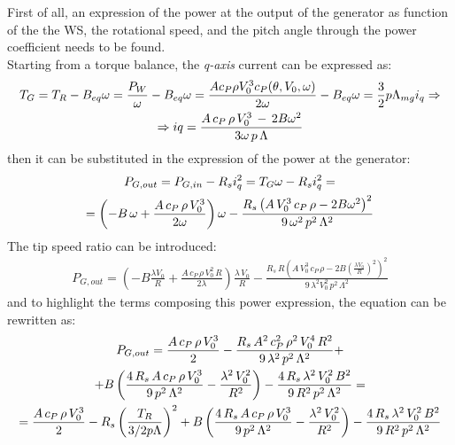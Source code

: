 First of all, an expression of the power at the output of the generator as function of the the WS, the rotational speed, and the pitch angle through the power coefficient needs to be found. \\
Starting from a torque balance, the \textit{q-axis} current can be expressed as:
\begin{gather}
  T_G = T_R - B_{eq}\omega = \frac{P_W}{\omega} - B_{eq}\omega = \frac{A c_P \rho V_0^3 c_P(\theta, V_0, \omega)}{2\omega} - B_{eq}\omega = \frac{3}{2}p\Lambda_{mg}i_q \Rightarrow \notag \\ 
  \Rightarrow iq = \frac{A \, c_P \, \rho \, V_0^3 \,-\,2B\omega^2}{3\omega\,p\,\Lambda} 
\end{gather}
then it can be substituted in the expression of the power at the generator:
\begin{gather}
  P_{G, out} = P_{G, in} - R_s i_q^2 = T_G \omega - R_s i_q^2 = \\ \notag
  = \left(-B\,\omega + \frac{A\,c_P\,\rho\,V_0^3}{2\omega}\right)\omega - \frac{R_s\left(A\,V_0^3\,c_P\,\rho - 2B\omega^2\right)^2}{9\,\omega^2\,p^2\,\Lambda^2} \label{eq:P_G_out_eq}
\end{gather}
The tip speed ratio can be introduced:
\begin{gather}
  P_{G, out} = \left(-B\frac{\lambda V_0}{R} + \frac{A\,c_P\,\rho\,V_0^2\,R}{2\lambda}\right)\frac{\lambda \, V_0}{R} - \frac{R_s\,R\left(A\,V_0^3\,c_P\,\rho - 2B\left(\frac{\lambda V_0}{R}\right)^2\right)^2}{9\,\lambda^2V_0^2\,p^2\,\Lambda^2}\label{eq:P_G_out_lambda}
\end{gather} 
and to highlight the terms composing this power expression, the equation can be rewritten as:
\begin{gather} 
   P_{G, out} = \frac{A\,c_P\,\rho\,V_0^3}{2} - \frac{R_s\,A^2\,c_P^2\,\rho^2\,V_0^4\,R^2}{9\,\lambda^2\,p^2\,\Lambda^2} + \notag \\
   +B\left(\frac{4\,R_s\,A\,c_P\,\rho\,V_0^3}{9\,p^2\,\Lambda^2} - \frac{\lambda^2\,V_0^2}{R^2}\right) - \frac{4\,R_s\,\lambda^2\,V_0^2\,B^2}{9\,R^2\,p^2\,\Lambda^2} =  \notag \\
   = \frac{A\,c_P\,\rho\,V_0^3}{2} - R_s \left(\frac{T_R}{3/2p\Lambda}\right)^2 + B\left(\frac{4\,R_s\,A\,c_P\,\rho\,V_0^3}{9\,p^2\,\Lambda^2} - \frac{\lambda^2\,V_0^2}{R^2}\right) - \frac{4\,R_s\,\lambda^2\,V_0^2\,B^2}{9\,R^2\,p^2\,\Lambda^2} \label{eq:P_G_out_damping}
\end{gather}

